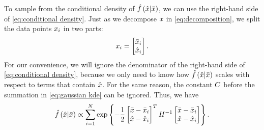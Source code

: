 To sample from the conditional density of $\hat{f}\left(  \hat{x} | \bar{x}  \right)$, we can use the right-hand side of \cref{eq:conditional density}.
Just as we decompose $x$ in \cref{eq:decomposition}, we split the data points $x_{i}$ in two parts:
\begin{equation}
	\label{eq:decomposition data}
	x_{i} = \begin{bmatrix}
		\bar{x}_{i} \\ \hat{x}_{i}
	\end{bmatrix}.
\end{equation}
For our convenience, we will ignore the denominator of the right-hand side of \cref{eq:conditional density}, because we only need to know how $\hat{f}\left(  \hat{x} | \bar{x}  \right)$ scales with respect to terms that contain $\hat{x}$.
For the same reason, the constant $C$ before the summation in \cref{eq:gaussian kde} can be ignored.
Thus, we have
\begin{equation}
	\label{eq:conditional proportional}
	\hat{f}\left(  \hat{x} | \bar{x}  \right)
	\propto \sum_{i=1}^{N} 
	\exp\left\{ 
		-\frac{1}{2} 
		\begin{bmatrix}
			\bar{x} - \bar{x}_{i} \\ 
			\hat{x} - \hat{x}_{i}
		\end{bmatrix}^T 
		H^{-1}
		\begin{bmatrix}
			\bar{x} - \bar{x}_{i} \\ 
			\hat{x} - \hat{x}_{i}
		\end{bmatrix}
	 \right\}.
\end{equation}

